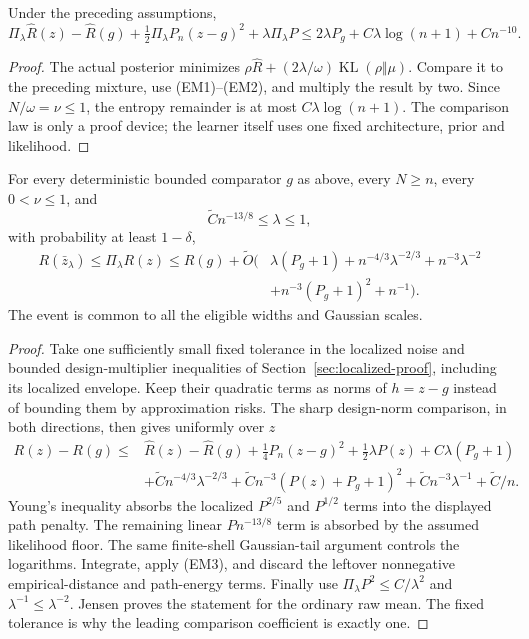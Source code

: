 \begin{lemma}
\label{lem:empirical-midpoint-objective}
Under the preceding assumptions,
\[
 \Pi_\lambda\widehat R(z)-\widehat R(g)
 +\tfrac12\Pi_\lambda P_n(z-g)^2+\lambda\Pi_\lambda P
 \le2\lambda P_g+C\lambda\log(n+1)+Cn^{-10}. \tag{EM3}
\]
\end{lemma}
\begin{proof}
The actual posterior minimizes
$\rho\widehat R+(2\lambda/\omega)\operatorname{KL}(\rho\Vert\mu)$.
Compare it to the preceding mixture, use (EM1)--(EM2), and
multiply the result by two. Since $N/\omega=\nu\le1$, the entropy
remainder is at most $C\lambda\log(n+1)$.
The comparison law is only a proof device; the learner itself
uses one fixed architecture, prior and likelihood.
\end{proof}

\begin{theorem}
\label{thm:wide-sharp-path}
For every deterministic bounded comparator $g$ as above, every
$N\ge n$, every $0<\nu\le1$, and
\[
 \widetilde Cn^{-13/8}\le\lambda\le1,
\]
with probability at least $1-\delta$,
\begin{align}
 R(\bar z_\lambda)\le\Pi_\lambda R(z)
 \le R(g)+\widetilde O\bigl(
 &\lambda(P_g+1)+n^{-4/3}\lambda^{-2/3}
       +n^{-3}\lambda^{-2}\\
 &+n^{-3}(P_g+1)^2+n^{-1}\bigr). \tag{EM4}
\end{align}
The event is common to all the eligible widths and Gaussian scales.
\end{theorem}
\begin{proof}
Take one sufficiently small fixed tolerance in the localized noise
and bounded design-multiplier inequalities of
Section~\ref{sec:localized-proof}, including its localized envelope. Keep their quadratic
terms as norms of $h=z-g$ instead of bounding them by approximation
risks. The sharp design-norm comparison, in both directions,
then gives uniformly over $z$
\begin{align*}
 R(z)-R(g)\le{}&
 \widehat R(z)-\widehat R(g)
 +\tfrac14P_n(z-g)^2+\tfrac12\lambda P(z)
 +C\lambda(P_g+1)\\
 &+\widetilde Cn^{-4/3}\lambda^{-2/3}
 +\widetilde Cn^{-3}(P(z)+P_g+1)^2
 +\widetilde Cn^{-3}\lambda^{-1}+\widetilde C/n.
\end{align*}
Young's inequality absorbs the localized $P^{2/5}$ and $P^{1/2}$
terms into the displayed path penalty. The remaining linear
$Pn^{-13/8}$ term is absorbed by the assumed likelihood floor.
The same finite-shell Gaussian-tail argument controls the logarithms.
Integrate, apply (EM3), and discard the leftover nonnegative
empirical-distance and path-energy terms. Finally use
$\Pi_\lambda P^2\le C/\lambda^2$ and
$\lambda^{-1}\le\lambda^{-2}$. Jensen proves the statement for
the ordinary raw mean. The fixed tolerance is why the leading
comparison coefficient is exactly one.
\end{proof}

